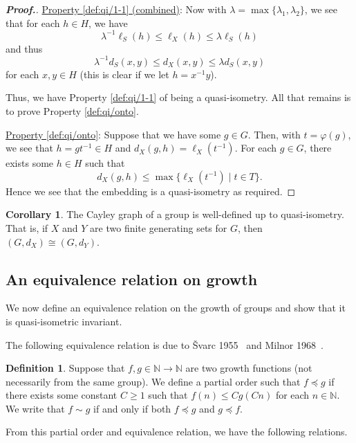 \documentclass[11pt,a4paper,reqno]{amsart}
\theoremstyle{plain}
\theoremstyle{definition}
\newtheorem{corollary}{Corollary}[theorem]
\newtheorem{definition}[theorem]{Definition}
\theoremstyle{definition}
\renewcommand\leq\leqslant
\renewcommand\geq\geqslant
\newenvironment{myproof}{\begin{proof}[\normalfont\bfseries Proof.]}{\end{proof}}
\begin{document}
\begin{myproof}
\medskip
\noindent
\underline{Property \ref{def:qi/1-1} (combined)}:
Now with $\lambda = \max\{\lambda_1,\lambda_2\}$, we see that for each $h\in H$, we have
\[
	\lambda^{-1}\ell_{S}(h)
	\leq 
	\ell_X(h)
	\leq
	\lambda \ell_S(h)
\]
and thus
\[
	\lambda^{-1} d_S(x,y)
	\leq
	d_X(x,y)
	\leq
	\lambda d_S(x,y)
\]
for each $x,y\in H$ (this is clear if we let $h=x^{-1}y$).

Thus, we have Property \ref{def:qi/1-1} of being a quasi-isometry.
All that remains is to prove Property \ref{def:qi/onto}.

\medskip
\noindent
\underline{Property \ref{def:qi/onto}}:
Suppose that we have some $g\in G$.
Then, with $t = \varphi(g)$, we see that $h=gt^{-1}\in H$ and $d_X(g,h) = \ell_X(t^{-1})$.
For each $g\in G$, there exists some $h\in H$ such that
\[
	d_X(g,h) \leq \max\{ \ell_X(t^{-1}) \mid t\in T \}.
\]
Hence we see that the embedding is a quasi-isometry as required.
\end{myproof}

\begin{corollary}\label{cor:well-defined-cayley}
	The Cayley graph of a group is well-defined up to quasi-isometry.
	That is, if $X$ and $Y$ are two finite generating sets for $G$, then $(G,d_X)\cong(G,d_Y)$.
\end{corollary}

\subsection{An equivalence relation on growth}

We now define an equivalence relation on the growth of groups and show that it is quasi-isometric invariant.

The following equivalence relation is due to Švarc 1955~\cite{svarc1955} and Milnor 1968~\cite{milnor1968}.

\begin{definition}\label{def:equiv}
	Suppose that $f,g\in \mathbb{N}\to \mathbb{N}$ are two growth functions (not necessarily from the same group).
	We define a partial order such that $f\preccurlyeq g$ if there exists some constant $C\geq 1$ such that
	$
		f(n) \leq Cg(Cn)
	$
	for each $n \in \mathbb{N}$.
	We write that $f\sim g$ if and only if both $f \preccurlyeq g$ and $g \preccurlyeq f$.
	
\end{definition}

From this partial order and equivalence relation, we have the following relations.
\end{document}
